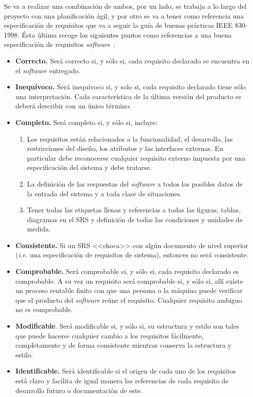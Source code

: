 Se va a realizar una combinación de ambos, por un lado, se trabaja a lo largo del proyecto con una planificación ágil, y por otro se va a tener como referencia una especificación de requisitos que va a seguir la guía de buenas prácticas IEEE 830-1998. Ésta última recoge los siguientes puntos como referencias a una buena especificación de requisitos \textit{software}~\cite{ingenieriasoftwareytiemporeal_2020}.
\begin{itemize}
\item \textbf{Correcto.} Será correcto si, y sólo si, cada requisito declarado se encuentra en el \textit{software} entregado.
\item \textbf{Inequívoco.} Será inequívoco si, y solo si, cada requisito declarado tiene sólo una interpretación. Cada característica de la última versión del producto se deberá describir con un único término.
\item \textbf{Completo.} Será completo si, y sólo si, incluye:
\begin{enumerate}
\item Los requisitos están relacionados a la funcionalidad, el desarrollo, las restricciones del diseño, los atributos y las interfaces externas. En particular debe reconocerse cualquier requisito externo impuesta por una especificación del sistema y debe tratarse.
\item La definición de las respuestas del \textit{software} a todos los posibles datos de la entrada del sistema y a toda clase de situaciones.
\item Tener todas las etiquetas llenas y referencias a todas las figuras, tablas, diagramas en el SRS y definición de todas las condiciones y unidades de medida.
\end{enumerate}
\item \textbf{Consistente.} Si un SRS <<choca>> con algún documento de nivel superior (\textit{i.e.} una especificación de requisitos de sistema), entonces no será consistente.
\item \textbf{Comprobable.} Será comprobable si, y sólo si, cada requisito declarado es comprobable. A su vez un requisito será comprobable si, y sólo si, allí existe un proceso rentable finito con que una persona o la máquina puede verificar que el producto del \textit{software} reúne el requisito. Cualquier requisito ambiguo no es comprobable.
\item \textbf{Modificable}. Será modificable si, y sólo si, su estructura y estilo son tales que puede hacerse cualquier cambio a los requisitos fácilmente, completamente y de forma consistente mientras conserva la estructura y estilo.
\item \textbf{Identificable.} Será identificable si el origen de cada uno de los requisitos está claro y facilita de igual manera las referencias de cada requisito de desarrollo futuro o documentación de este.
\end{itemize}


